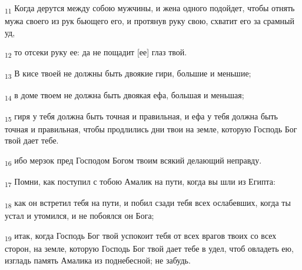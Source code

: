 \begin{tcolorbox}
\textsubscript{11} Когда дерутся между собою мужчины, и жена одного подойдет, чтобы отнять мужа своего из рук бьющего его, и протянув руку свою, схватит его за срамный уд,
\end{tcolorbox}
\begin{tcolorbox}
\textsubscript{12} то отсеки руку ее: да не пощадит [ее] глаз твой.
\end{tcolorbox}
\begin{tcolorbox}
\textsubscript{13} В кисе твоей не должны быть двоякие гири, большие и меньшие;
\end{tcolorbox}
\begin{tcolorbox}
\textsubscript{14} в доме твоем не должна быть двоякая ефа, большая и меньшая;
\end{tcolorbox}
\begin{tcolorbox}
\textsubscript{15} гиря у тебя должна быть точная и правильная, и ефа у тебя должна быть точная и правильная, чтобы продлились дни твои на земле, которую Господь Бог твой дает тебе.
\end{tcolorbox}
\begin{tcolorbox}
\textsubscript{16} ибо мерзок пред Господом Богом твоим всякий делающий неправду.
\end{tcolorbox}
\begin{tcolorbox}
\textsubscript{17} Помни, как поступил с тобою Амалик на пути, когда вы шли из Египта:
\end{tcolorbox}
\begin{tcolorbox}
\textsubscript{18} как он встретил тебя на пути, и побил сзади тебя всех ослабевших, когда ты устал и утомился, и не побоялся он Бога;
\end{tcolorbox}
\begin{tcolorbox}
\textsubscript{19} итак, когда Господь Бог твой успокоит тебя от всех врагов твоих со всех сторон, на земле, которую Господь Бог твой дает тебе в удел, чтоб овладеть ею, изгладь память Амалика из поднебесной; не забудь.
\end{tcolorbox}
